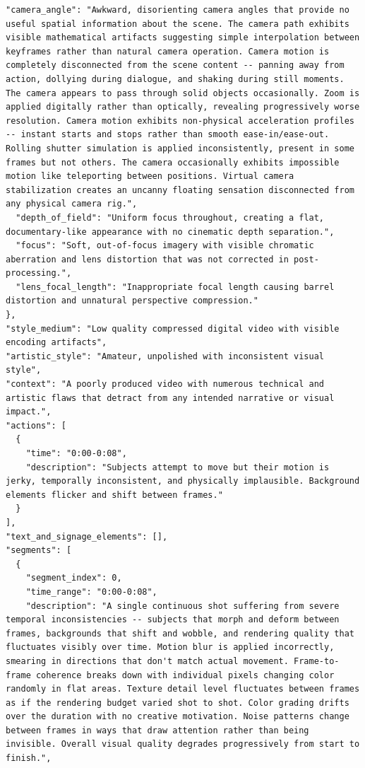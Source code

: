 \documentclass{llmxive}
\begin{document}
\begin{tcolorbox}
\begin{Verbatim}[breaklines=true,breakanywhere=true,fontsize=\scriptsize]
  "camera_angle": "Awkward, disorienting camera angles that provide no useful spatial information about the scene. The camera path exhibits visible mathematical artifacts suggesting simple interpolation between keyframes rather than natural camera operation. Camera motion is completely disconnected from the scene content -- panning away from action, dollying during dialogue, and shaking during still moments. The camera appears to pass through solid objects occasionally. Zoom is applied digitally rather than optically, revealing progressively worse resolution. Camera motion exhibits non-physical acceleration profiles -- instant starts and stops rather than smooth ease-in/ease-out. Rolling shutter simulation is applied inconsistently, present in some frames but not others. The camera occasionally exhibits impossible motion like teleporting between positions. Virtual camera stabilization creates an uncanny floating sensation disconnected from any physical camera rig.",
  "depth_of_field": "Uniform focus throughout, creating a flat, documentary-like appearance with no cinematic depth separation.",
  "focus": "Soft, out-of-focus imagery with visible chromatic aberration and lens distortion that was not corrected in post-processing.",
  "lens_focal_length": "Inappropriate focal length causing barrel distortion and unnatural perspective compression."
},
"style_medium": "Low quality compressed digital video with visible encoding artifacts",
"artistic_style": "Amateur, unpolished with inconsistent visual style",
"context": "A poorly produced video with numerous technical and artistic flaws that detract from any intended narrative or visual impact.",
"actions": [
  {
    "time": "0:00-0:08",
    "description": "Subjects attempt to move but their motion is jerky, temporally inconsistent, and physically implausible. Background elements flicker and shift between frames."
  }
],
"text_and_signage_elements": [],
"segments": [
  {
    "segment_index": 0,
    "time_range": "0:00-0:08",
    "description": "A single continuous shot suffering from severe temporal inconsistencies -- subjects that morph and deform between frames, backgrounds that shift and wobble, and rendering quality that fluctuates visibly over time. Motion blur is applied incorrectly, smearing in directions that don't match actual movement. Frame-to-frame coherence breaks down with individual pixels changing color randomly in flat areas. Texture detail level fluctuates between frames as if the rendering budget varied shot to shot. Color grading drifts over the duration with no creative motivation. Noise patterns change between frames in ways that draw attention rather than being invisible. Overall visual quality degrades progressively from start to finish.",

\end{Verbatim}
\end{tcolorbox}
\end{document}
